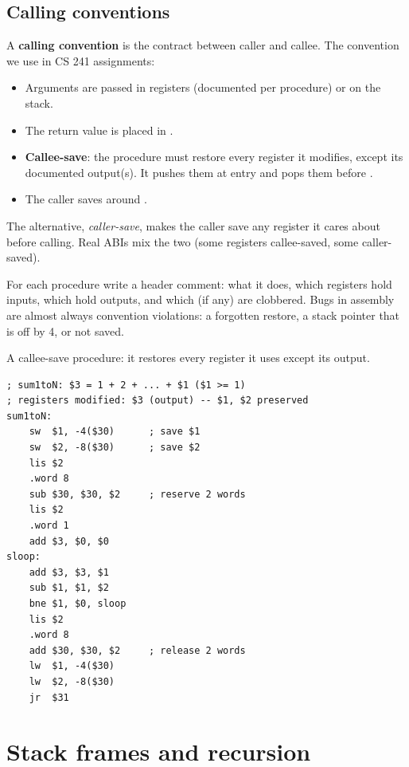 \subsection{Calling conventions}
A \textbf{calling convention} is the contract between caller and callee. The convention we
use in CS 241 assignments:
\begin{itemize}
  \item Arguments are passed in registers (documented per procedure) or on the stack.
  \item The return value is placed in .
  \item \textbf{Callee-save}: the procedure must restore every register it modifies, except
        its documented output(s). It pushes them at entry and pops them before .
  \item The caller saves  around .
\end{itemize}
The alternative, \emph{caller-save}, makes the caller save any register it cares about
before calling. Real ABIs mix the two (some registers callee-saved, some caller-saved).

\begin{important}
For each procedure write a header comment: what it does, which registers hold inputs,
which hold outputs, and which (if any) are clobbered. Bugs in assembly are almost always
convention violations: a forgotten restore, a stack pointer that is off by 4, or 
not saved.
\end{important}

\begin{example}
A callee-save procedure: it restores every register it uses except its output.
\begin{lstlisting}[style=mips]
; sum1toN: $3 = 1 + 2 + ... + $1 ($1 >= 1)
; registers modified: $3 (output) -- $1, $2 preserved
sum1toN:
    sw  $1, -4($30)      ; save $1
    sw  $2, -8($30)      ; save $2
    lis $2
    .word 8
    sub $30, $30, $2     ; reserve 2 words
    lis $2
    .word 1
    add $3, $0, $0
sloop:
    add $3, $3, $1
    sub $1, $1, $2
    bne $1, $0, sloop
    lis $2
    .word 8
    add $30, $30, $2     ; release 2 words
    lw  $1, -4($30)
    lw  $2, -8($30)
    jr  $31
\end{lstlisting}
\end{example}

\section{Stack frames and recursion}

